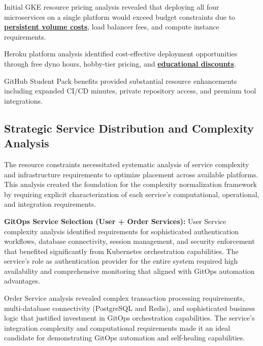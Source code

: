 Initial GKE resource pricing analysis revealed that deploying all four microservices on a single platform would exceed budget constraints due to \textbf{\hyperref[cloud_native_patterns]{persistent volume costs}}, load balancer fees, and compute instance requirements.


Heroku platform analysis identified cost-effective deployment opportunities through free dyno hours, hobby-tier pricing, and \textbf{\hyperref[heroku_platform2023]{educational discounts}}.

GitHub Student Pack benefits \cite{github_education2023} provided substantial resource enhancements including expanded CI/CD minutes, private repository access, and premium tool integrations.

\subsection{Strategic Service Distribution and Complexity Analysis}

The resource constraints necessitated systematic analysis of service complexity and infrastructure requirements to optimize placement across available platforms. This analysis created the foundation for the complexity normalization framework by requiring explicit characterization of each service's computational, operational, and integration requirements.

\textbf{GitOps Service Selection (User + Order Services):}
User Service complexity analysis identified requirements for sophisticated authentication workflows, database connectivity, session management, and security enforcement that benefited significantly from Kubernetes orchestration capabilities. The service's role as authentication provider for the entire system required high availability and comprehensive monitoring that aligned with GitOps automation advantages.

Order Service analysis revealed complex transaction processing requirements, multi-database connectivity (PostgreSQL and Redis), and sophisticated business logic that justified investment in GitOps orchestration capabilities. The service's integration complexity and computational requirements made it an ideal candidate for demonstrating GitOps automation and self-healing capabilities.

